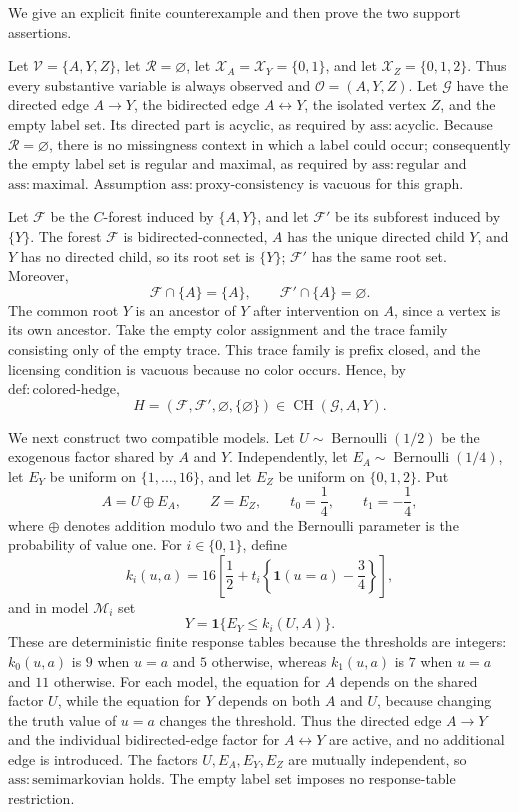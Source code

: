 We give an explicit finite counterexample and then prove the two support assertions.

Let \(\mathcal V=\{A,Y,Z\}\), let \(\mathcal R=\varnothing\), let \(\mathcal X_A=\mathcal X_Y=\{0,1\}\), and let \(\mathcal X_Z=\{0,1,2\}\). Thus every substantive variable is always observed and \(\mathcal O=(A,Y,Z)\). Let \(\mathcal G\) have the directed edge \(A\to Y\), the bidirected edge \(A\leftrightarrow Y\), the isolated vertex \(Z\), and the empty label set. Its directed part is acyclic, as required by \(\mathrm{ass{:}acyclic}\). Because \(\mathcal R=\varnothing\), there is no missingness context in which a label could occur; consequently the empty label set is regular and maximal, as required by \(\mathrm{ass{:}regular}\) and \(\mathrm{ass{:}maximal}\). Assumption \(\mathrm{ass{:}proxy\text{-}consistency}\) is vacuous for this graph.

Let \(\mathcal F\) be the \(C\)-forest induced by \(\{A,Y\}\), and let \(\mathcal F'\) be its subforest induced by \(\{Y\}\). The forest \(\mathcal F\) is bidirected-connected, \(A\) has the unique directed child \(Y\), and \(Y\) has no directed child, so its root set is \(\{Y\}\); \(\mathcal F'\) has the same root set. Moreover,
\[
 \mathcal F\cap\{A\}=\{A\},
 \qquad
 \mathcal F'\cap\{A\}=\varnothing.
\]
The common root \(Y\) is an ancestor of \(Y\) after intervention on \(A\), since a vertex is its own ancestor. Take the empty color assignment and the trace family consisting only of the empty trace. This trace family is prefix closed, and the licensing condition is vacuous because no color occurs. Hence, by \(\mathrm{def{:}colored\text{-}hedge}\),
\[
 H=(\mathcal F,\mathcal F',\varnothing,\{\varnothing\})
 \in \operatorname{CH}(\mathcal G,A,Y).
\]

We next construct two compatible models. Let \(U\sim\operatorname{Bernoulli}(1/2)\) be the exogenous factor shared by \(A\) and \(Y\). Independently, let \(E_A\sim\operatorname{Bernoulli}(1/4)\), let \(E_Y\) be uniform on \(\{1,\ldots,16\}\), and let \(E_Z\) be uniform on \(\{0,1,2\}\). Put
\[
 A=U\mathbin{\oplus}E_A,
 \qquad
 Z=E_Z,
 \qquad
 t_0=\frac14,
 \qquad
 t_1=-\frac14,
\]
where \(\oplus\) denotes addition modulo two and the Bernoulli parameter is the probability of value one. For \(i\in\{0,1\}\), define
\[
 k_i(u,a)
 =16\left[\frac12+t_i\left\{\mathbf 1(u=a)-\frac34\right\}\right],
\]
and in model \(\mathcal M_i\) set
\[
 Y=\mathbf 1\{E_Y\leq k_i(U,A)\}.
\]
These are deterministic finite response tables because the thresholds are integers: \(k_0(u,a)\) is \(9\) when \(u=a\) and \(5\) otherwise, whereas \(k_1(u,a)\) is \(7\) when \(u=a\) and \(11\) otherwise. For each model, the equation for \(A\) depends on the shared factor \(U\), while the equation for \(Y\) depends on both \(A\) and \(U\), because changing the truth value of \(u=a\) changes the threshold. Thus the directed edge \(A\to Y\) and the individual bidirected-edge factor for \(A\leftrightarrow Y\) are active, and no additional edge is introduced. The factors \(U,E_A,E_Y,E_Z\) are mutually independent, so \(\mathrm{ass{:}semimarkovian}\) holds. The empty label set imposes no response-table restriction.

